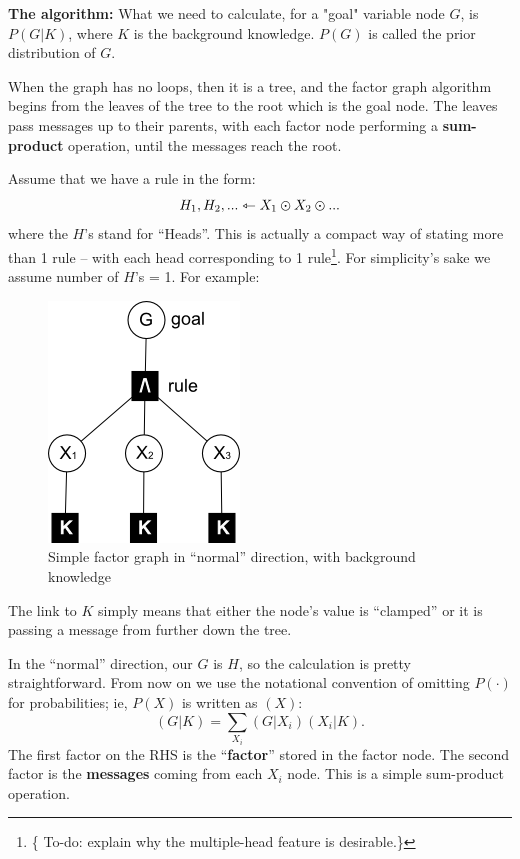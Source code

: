 \textbf{The algorithm:}  What we need to calculate, for a "goal" variable node $G$, is $P(G|K)$, where $K$ is the background knowledge.  $P(G)$ is called the prior distribution of $G$.

When the graph has no loops, then it is a tree, and the factor graph algorithm begins from the leaves of the tree to the root which is the goal node.  The leaves pass messages up to their parents, with each factor node performing a \textbf{sum-product} operation, until the messages reach the root.

Assume that we have a rule in the form:
\begin{equation}
H_1, H_2, ... \leftarrowtriangle X_1 \varodot X_2 \varodot ...
\end{equation}
where the $H$'s stand for ``Heads''.  This is actually a compact way of stating more than 1 rule -- with each head corresponding to 1 rule\footnote{\{ To-do: explain why the multiple-head feature is desirable.\}}.  For simplicity's sake we assume number of $H$'s = 1.  For example:
\begin{figure}[H]
\centering
\includegraphics{simple-proof-tree2.png}
\caption{Simple factor graph in ``normal'' direction, with background knowledge}
\end{figure}
The link to $K$ simply means that either the node's value is ``clamped'' or it is passing a message from further down the tree.

In the ``normal'' direction, our $G$ is $H$, so the calculation is pretty straightforward.  From now on we use the notational convention of omitting $P(\cdot)$ for probabilities; ie, $P(X)$ is written as $(X)$:
\begin{equation}
(G|K) = \sum_{X_i} (G|X_i)(X_i|K).
\end{equation}
The first factor on the RHS is the ``\textbf{factor}'' stored in the factor node.  The second factor is the \textbf{messages} coming from each $X_i$ node.  This is a simple sum-product operation.

